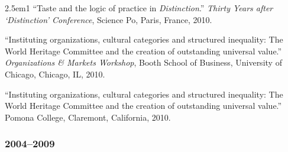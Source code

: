 \documentclass[
]{article}
\newenvironment{cventry}{\begin{hangparas}{2.5em}{1}}{\end{hangparas}}
\begin{document}
\begin{cventry}
``Taste and the logic of practice in \emph{Distinction}.'' \emph{Thirty
Years after `Distinction' Conference}, Science Po, Paris, France, 2010.

``Instituting organizations, cultural categories and structured
inequality: The World Heritage Committee and the creation of outstanding
universal value.'' \emph{Organizations \& Markets Workshop}, Booth
School of Business, University of Chicago, Chicago, IL, 2010.

``Instituting organizations, cultural categories and structured
inequality: The World Heritage Committee and the creation of outstanding
universal value.'' Pomona College, Claremont, California, 2010.

\end{cventry}

\subsubsection{2004--2009}\label{section-25}
\end{document}
